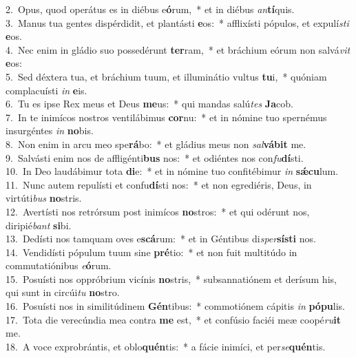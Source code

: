 {2.~}Opus, quod operátus es in diébus e\textbf{ó}rum,~* et in diébus \textit{an}\textbf{tí}quis.\\
{3.~}Manus tua gentes dispérdidit, et plantásti \textbf{e}os:~* afflixísti pópulos, et expulí\textit{sti} \textbf{e}os.\\
{4.~}Nec enim in gládio suo possedérunt \textbf{ter}ram,~* et bráchium eórum non salvá\textit{vit} \textbf{e}os:\\
{5.~}Sed déxtera tua, et bráchium tuum, et illuminátio vultus \textbf{tu}i,~* quóniam complacuísti \textit{in} \textbf{e}is.\\
{6.~}Tu es ipse Rex meus et Deus \textbf{me}us:~* qui mandas salú\textit{tes} \textbf{Ja}cob.\\
{7.~}In te inimícos nostros ventilábimus \textbf{cor}nu:~* et in nómine tuo spernémus insurgéntes \textit{in} \textbf{no}bis.\\
{8.~}Non enim in arcu meo spe\textbf{rá}bo:~* et gládius meus non \textit{sal}\textbf{vá}\textbf{bit} me.\\
{9.~}Salvásti enim nos de affligénti\textbf{bus} nos:~* et odiéntes nos con\textit{fu}\textbf{dí}sti.\\
{10.~}In Deo laudábimur tota \textbf{di}e:~* et in nómine tuo confitébimur \textit{in} \textbf{sǽ}\textbf{cu}lum.\\
{11.~}Nunc autem repulísti et confu\textbf{dí}sti nos:~* et non egrediéris, Deus, in virtúti\textit{bus} \textbf{no}stris.\\
{12.~}Avertísti nos retrórsum post inimícos \textbf{no}stros:~* et qui odérunt nos, diripié\textit{bant} \textbf{si}bi.\\
{13.~}Dedísti nos tamquam oves e\textbf{scá}rum:~* et in Géntibus di\textit{sper}\textbf{sí}\textbf{sti} nos.\\
{14.~}Vendidísti pópulum tuum sine \textbf{pré}tio:~* et non fuit multitúdo in commutatiónibus \textit{e}\textbf{ó}rum.\\
{15.~}Posuísti nos oppróbrium vicínis \textbf{no}stris,~* subsannatiónem et derísum his, qui sunt in circúi\textit{tu} \textbf{no}stro.\\
{16.~}Posuísti nos in similitúdinem \textbf{Gén}tibus:~* commotiónem cápitis \textit{in} \textbf{pó}\textbf{pu}lis.\\
{17.~}Tota die verecúndia mea contra \textbf{me} est,~* et confúsio faciéi meæ coopé\textit{ru}\textbf{it} me.\\
{18.~}A voce exprobrántis, et oblo\textbf{quén}tis:~* a fácie inimíci, et per\textit{se}\textbf{quén}tis.\\

